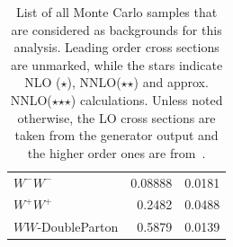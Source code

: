 \begin{table}[htbp!]
\begin{tabular}{|l|r|r|}
\hline
$W^-W^-$ & 0.08888 & 0.0181 \\
$W^+W^+$ & 0.2482 & 0.0488 \\
$WW$-DoubleParton & 0.5879 & 0.0139 \\
\hline
  \end{tabular}
  \caption{List of all Monte Carlo samples that are considered as backgrounds for this analysis. Leading order cross sections are unmarked, while the stars indicate NLO ($\star$), NNLO($\star$$\star$) and approx. NNLO($\star$$\star$$\star$) calculations. Unless noted otherwise, the LO cross sections are taken from the generator output and the higher order ones are from~\cite{xsec}.}
  \label{tab:mcsamples}
\end{table}

\begin{comment}
  #+ORGTBL: SEND datasetsmc orgtbl-to-latex :splice t :no-escape t
  |---------------------------------------------------------------------------------------------------+-------------------------------------------------------------+---------------------|
  | Monte Carlo Samples                                                                               | $\sigma [\text{pb}^{-1}]$                                   |             Weights |
  |---------------------------------------------------------------------------------------------------+-------------------------------------------------------------+---------------------|
  |---------------------------------------------------------------------------------------------------+-------------------------------------------------------------+---------------------|
  | $Z/\gamma^* \rightarrow ll$ $(10\,\text{GeV} < m_{ll} < 50\,\text{GeV})$                          | 762.45                                                      | $1.25 \cdot 2.1029$ |
  | $Z/\gamma^* \rightarrow ll$ $(50\,\text{GeV} < m_{ll})$                                           | 3503.71 $\star$$\star$                                      | $0.96 \cdot 2.2627$ |
  |---------------------------------------------------------------------------------------------------+-------------------------------------------------------------+---------------------|
  | QCD $\mu_{p_\text{T} > 5\,\text{GeV}}$-enr. ($15\,\text{GeV} < p_{\text{T}} < 20\,\text{GeV}$)    | 2738580.0                                                   |          31271.3770 |
  | QCD $\mu_{p_\text{T} > 5\,\text{GeV}}$-enr. ($20\,\text{GeV} < p_{\text{T}} < 30\,\text{GeV}$)    | 1865500.0                                                   |           4323.8677 |

\end{comment}
